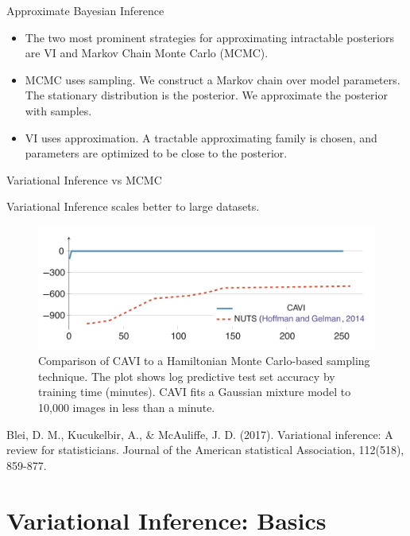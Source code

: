 \documentclass[10pt]{beamer}
\newcommand{\+}[1]{\ensuremath{{\boldsymbol #1}}} %
\begin{document}
\begin{frame}{Approximate Bayesian Inference}

\begin{itemize}
\item The two most prominent strategies for approximating intractable posteriors are VI and Markov Chain Monte Carlo (MCMC). 
\item MCMC  uses \alert{sampling}.  We construct a Markov chain over model parameters.  The stationary distribution is the posterior.  We approximate the posterior with samples.
\item VI uses \alert{approximation}.  A tractable approximating family is chosen, and parameters are optimized to be close to the posterior.
\end{itemize}

\end{frame}

\begin{frame}{Variational Inference vs MCMC}

Variational Inference scales better to large datasets.

\begin{figure}
\includegraphics[width=\textwidth]{images/CAVI_vs_HamiltonianMCMC}
\caption{ Comparison of CAVI to a Hamiltonian Monte Carlo-based sampling technique.  The plot shows log predictive test set accuracy by training time (minutes).  CAVI fits a Gaussian mixture model to 10,000 images in less than a minute.}
\end{figure}
\vfill
\tiny Blei, D. M., Kucukelbir, A., \& McAuliffe, J. D. (2017). Variational inference: A review for statisticians. Journal of the American statistical Association, 112(518), 859-877.
\end{frame}


\section{Variational Inference: Basics}
\end{document}
